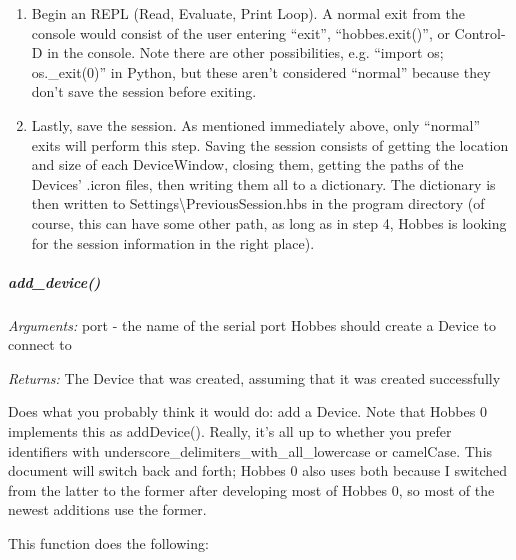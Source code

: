 \documentclass[12pt,letterpaper]{article}
\begin{document}
\begin{enumerate}
\selectfont

\item Begin an REPL (Read, Evaluate, Print Loop). A normal exit from the console would consist of the user entering ``exit'', ``hobbes.exit()'', or Control-D in the console. Note there are other possibilities, e.g. ``import os; os.\_exit(0)'' in Python, but these aren't considered ``normal'' because they don't save the session before exiting.

\item Lastly, save the session. As mentioned immediately above, only ``normal'' exits will perform this step. Saving the session consists of getting the location and size of each DeviceWindow, closing them, getting the paths of the Devices' .icron files, then writing them all to a dictionary. The dictionary is then written to Settings\textbackslash PreviousSession.hbs in the program directory (of course, this can have some other path, as long as in step 4, Hobbes is looking for the session information in the right place).

\end{enumerate}



%
%
\subparagraph{add\_device()}
\label{4.1.1.0.1}

\emph{Arguments:} port - the name of the serial port Hobbes should create a Device to connect to

\emph{Returns:} The Device that was created, assuming that it was created successfully

Does what you probably think it would do: add a Device. Note that Hobbes 0 implements this as addDevice(). Really, it's all up to whether you prefer identifiers with underscore\_delimiters\_with\_all\_lowercase or camelCase. This document will switch back and forth; Hobbes 0 also uses both because I switched from the latter to the former after developing most of Hobbes 0, so most of the newest additions use the former.

This function does the following:
\end{document}
